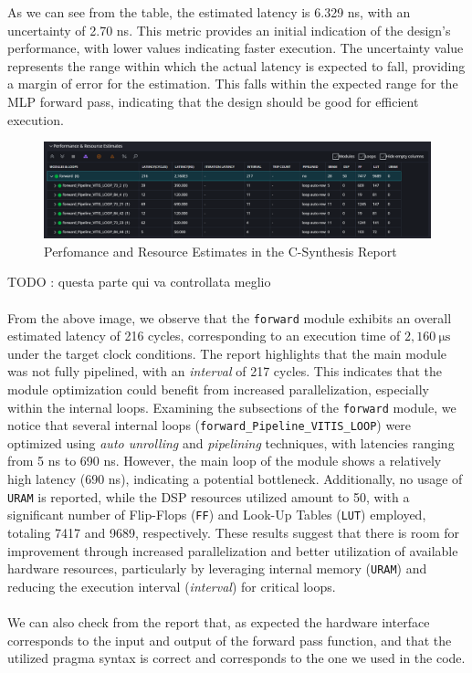 \documentclass{article}
\begin{document}
As we can see from the table, the estimated latency is 6.329 ns, with an uncertainty of 2.70 ns. This metric provides an initial indication of the design's performance, with lower values indicating faster execution. The uncertainty value represents the range within which the actual latency is expected to fall, providing a margin of error for the estimation. This falls within the expected range for the MLP forward pass, indicating that the design should be good for efficient execution.

\begin{figure}[H]
    \centering
    \includegraphics[width=1\textwidth]{./assets/MLP/c-synthesis-performanceandresourceestimaes.png}
    \caption{Perfomance and Resource Estimates in the C-Synthesis Report}
    \label{fig:c-synthesis-performance-resources}
\end{figure}

TODO : questa parte qui va controllata meglio
\\\\From the above image, we observe that the \texttt{forward} module exhibits an overall estimated latency of 216 cycles, corresponding to an execution time of $2,160\ \mathrm{\mu s}$ under the target clock conditions. The report highlights that the main module was not fully pipelined, with an \textit{interval} of 217 cycles. This indicates that the module optimization could benefit from increased parallelization, especially within the internal loops.
Examining the subsections of the \texttt{forward} module, we notice that several internal loops (\texttt{forward\_Pipeline\_VITIS\_LOOP}) were optimized using \textit{auto unrolling} and \textit{pipelining} techniques, with latencies ranging from 5 ns to 690 ns. However, the main loop of the module shows a relatively high latency (690 ns), indicating a potential bottleneck. Additionally, no usage of \texttt{URAM} is reported, while the DSP resources utilized amount to 50, with a significant number of Flip-Flops (\texttt{FF}) and Look-Up Tables (\texttt{LUT}) employed, totaling 7417 and 9689, respectively.
These results suggest that there is room for improvement through increased parallelization and better utilization of available hardware resources, particularly by leveraging internal memory (\texttt{URAM}) and reducing the execution interval (\textit{interval}) for critical loops.
\\\\We can also check from the report that, as expected the hardware interface corresponds to the input and output of the forward pass function, and that the utilized pragma syntax is correct and corresponds to the one we used in the code.
\end{document}
